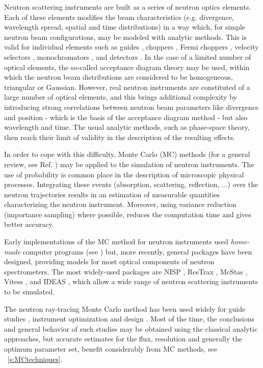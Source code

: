 Neutron scattering instruments are built as a series of neutron optics elements. Each of these elements modifies the beam characteristics (e.g. divergence, wavelength spread, spatial and time distributions) in a way which, for simple neutron beam configurations, may be modeled with analytic methods. This is valid for individual elements such as guides \cite{Leibnitz63,Mildner90}, choppers \cite{Lowde60,Copley03}, Fermi choppers \cite{Fermi47,Peters05}, velocity selectors \cite{Clark66}, monochromators \cite{Freund83,Sears97,Shirane02,Alianelli04}, and detectors \cite{Radeka74,Charpak89,Manzin04}. In the case of a limited number of optical elements, the so-called acceptance diagram theory \cite{Mildner90,Copley93,Cussen03} may be used, within which the neutron beam distributions are considered to be homogeneous, triangular or Gaussian.
However, real neutron instruments are constituted of a large number of optical elements, and this brings additional complexity by introducing strong correlations between neutron beam parameters like divergence and position - which is the basis of the acceptance diagram method - but also wavelength and time. The usual analytic methods, such as phase-space theory, then reach their limit of validity in the description of the resulting effects.

In order to cope with this difficulty, Monte Carlo (MC) methods (for a general review, see Ref. \cite{James80}) may be applied to the simulation of neutron instruments.
The use of probability is common place in the description of microscopic physical processes. Integrating these events (absorption, scattering, reflection, ...) over the neutron trajectories
results in an estimation of measurable quantities characterizing the neutron instrument. Moreover, using variance reduction (importance sampling)
where possible, reduces the computation time and gives better accuracy.

Early implementations of the MC method for neutron instruments used \emph{home-made} computer programs  (see \cite{Copley86,Mildner77}) but, more recently, general packages have been designed, providing models for most optical components of neutron spectrometers.
The most widely-used packages are NISP \cite{NISP}, ResTrax \cite{Restrax}, McStas \cite{mcs_ppf,nn_10_20,mcstas_webpage}, Vitess \cite{Vitess}, and IDEAS \cite{IDEAS}, which allow a wide range of neutron scattering instruments to be simulated.

The neutron ray-tracing Monte Carlo method has been used widely for
guide studies \cite{Copley93,Farhi02,Schanzer04}, instrument
optimization and design \cite{Zsigmond04,Lieutenant05}. Most of the
time, the conclusions and general behavior of such studies may be
obtained using the classical analytic approaches, but accurate
estimates for the flux, resolution and generally the optimum parameter
set, benefit considerably from MC methods, see ~\ref{s:MCtechniques}.

